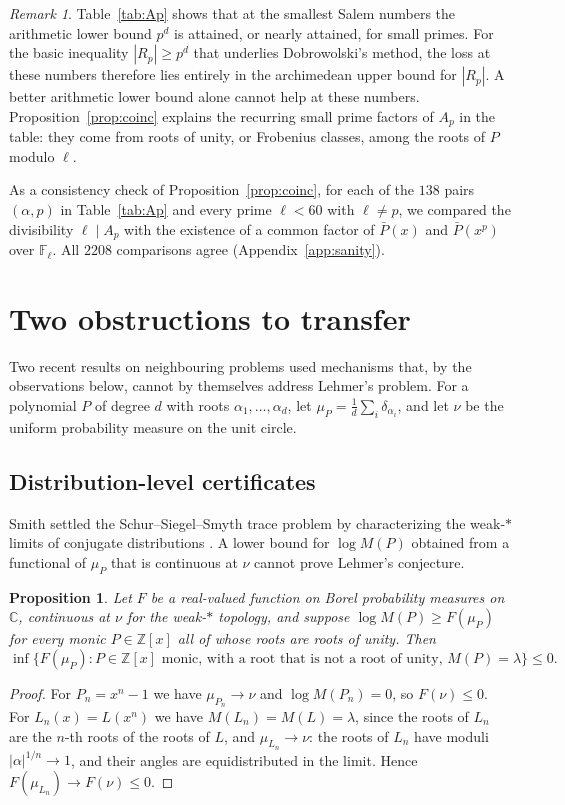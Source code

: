 \documentclass[11pt]{amsart}
\newtheorem{proposition}[theorem]{Proposition}
\theoremstyle{definition}
\theoremstyle{remark}
\newtheorem{remark}[theorem]{Remark}
\newcommand{\Z}{\mathbb Z}
\newcommand{\C}{\mathbb C}
\newcommand{\F}{\mathbb F}
\begin{document}
\begin{remark}
Table~\ref{tab:Ap} shows that at the smallest Salem numbers the arithmetic lower bound $p^d$ is attained, or nearly attained, for small primes. For the basic inequality $|R_p|\ge p^d$ that underlies Dobrowolski's method, the loss at these numbers therefore lies entirely in the archimedean upper bound for $|R_p|$. A better arithmetic lower bound alone cannot help at these numbers. Proposition~\ref{prop:coinc} explains the recurring small prime factors of $A_p$ in the table: they come from roots of unity, or Frobenius classes, among the roots of $P$ modulo $\ell$.
\end{remark}

As a consistency check of Proposition~\ref{prop:coinc}, for each of the $138$ pairs $(\alpha,p)$ in Table~\ref{tab:Ap} and every prime $\ell<60$ with $\ell\ne p$, we compared the divisibility $\ell\mid A_p$ with the existence of a common factor of $\bar P(x)$ and $\bar P(x^p)$ over $\F_\ell$. All $2208$ comparisons agree (Appendix~\ref{app:sanity}).

\section{Two obstructions to transfer}\label{sec:obstr}

Two recent results on neighbouring problems used mechanisms that, by the observations below, cannot by themselves address Lehmer's problem. For a polynomial $P$ of degree $d$ with roots $\alpha_1,\dots,\alpha_d$, let $\mu_P=\frac1d\sum_i\delta_{\alpha_i}$, and let $\nu$ be the uniform probability measure on the unit circle.

\subsection{Distribution-level certificates}
Smith settled the Schur--Siegel--Smyth trace problem by characterizing the weak-$*$ limits of conjugate distributions \cite{Smith}. A lower bound for $\log M(P)$ obtained from a functional of $\mu_P$ that is continuous at $\nu$ cannot prove Lehmer's conjecture.

\begin{proposition}\label{prop:bilu}
Let $F$ be a real-valued function on Borel probability measures on $\C$, continuous at $\nu$ for the weak-$*$ topology, and suppose $\log M(P)\ge F(\mu_P)$ for every monic $P\in\Z[x]$ all of whose roots are roots of unity. Then
\[
\inf\{F(\mu_P): P\in\Z[x]\text{ monic, with a root that is not a root of unity, }M(P)=\lambda\}\le0.
\]
\end{proposition}
\begin{proof}
For $P_n=x^n-1$ we have $\mu_{P_n}\to\nu$ and $\log M(P_n)=0$, so $F(\nu)\le0$. For $L_n(x)=L(x^n)$ we have $M(L_n)=M(L)=\lambda$, since the roots of $L_n$ are the $n$-th roots of the roots of $L$, and $\mu_{L_n}\to\nu$: the roots of $L_n$ have moduli $|\alpha|^{1/n}\to1$, and their angles are equidistributed in the limit. Hence $F(\mu_{L_n})\to F(\nu)\le0$.
\end{proof}
\end{document}
